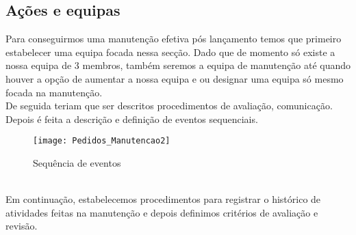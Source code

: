 \subsection{Ações e equipas}
Para conseguirmos uma manutenção efetiva pós lançamento temos que primeiro estabelecer uma equipa focada nessa secção. Dado que de momento só existe a nossa equipa de 3 membros, também seremos a equipa de manutenção até quando houver a opção de aumentar a nossa equipa e ou designar uma equipa só mesmo focada na manutenção.\\
De seguida teriam que ser descritos procedimentos de avaliação, comunicação.\\
Depois é feita a descrição e definição de eventos sequenciais.\\

\begin{figure}[H]
	\centering
	\texttt{[image: Pedidos\_Manutencao2]}
	\caption{Sequência de eventos}
	\label{fig:Pedidos_Manutençao2}
\end{figure}
\\
Em continuação, estabelecemos procedimentos para registrar o histórico de atividades feitas na manutenção e depois definimos critérios de avaliação e revisão.